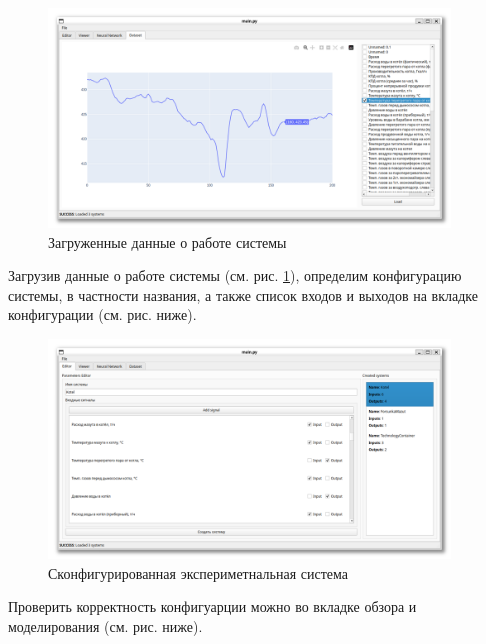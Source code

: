 \begin{figure}[H]
  \begin{center}
    \includegraphics[width=0.95\textwidth]{figures/modules/loader.png}
  \end{center}
  \caption{Загруженные данные о работе системы}\label{fig:test:loaded_data}
\end{figure}

Загрузив данные о работе системы (см. рис. \ref{fig:test:loaded_data}),
определим конфигурацию системы, в частности названия, а также список входов и
выходов на вкладке конфигурации (см. рис. ниже).

\begin{figure}[H]
  \begin{center}
    \includegraphics[width=0.95\textwidth]{figures/modules/editor.png}
  \end{center}
  \caption{Сконфигурированная экспериметнальная
  система}\label{fig:test:configured_system}
\end{figure}

Проверить корректность конфигуарции можно во вкладке обзора и моделирования (см.
рис. ниже). 

